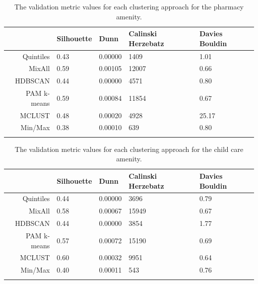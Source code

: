 \documentclass[11pt, a4paper]{article}
\begin{document}
\centering
\begin{longtable}[H]{|r|llll|}
  \hline
 & Silhouette & Dunn & Calinski Herzebatz & Davies Bouldin \\ 
  \hline
Quintiles & 0.43 & 0.00000 &  1409 &  1.01 \\ 
   \hline
MixAll & 0.59 & 0.00105 & 12007 &  0.66 \\ 
   \hline
HDBSCAN & 0.44 & 0.00000 &  4571 &  0.80 \\ 
   \hline
PAM k-means & 0.59 & 0.00084 & 11854 &  0.67 \\ 
   \hline
MCLUST & 0.48 & 0.00020 &  4928 & 25.17 \\ 
   \hline
Min/Max & 0.38 & 0.00010 &   639 &  0.80 \\ 
   \hline
\caption[Pharmacy validation metrics]{The validation metric values for each clustering approach for the pharmacy amenity.}\label{pharmacyvalid}
\end{longtable}









\centering
\begin{longtable}[H]{|r|llll|}
 \hline
 & Silhouette & Dunn & Calinski Herzebatz & Davies Bouldin \\ 
  \hline
Quintiles & 0.44 & 0.00000 &  3696 & 0.79 \\ 
   \hline
MixAll & 0.58 & 0.00067 & 15949 & 0.67 \\ 
   \hline
HDBSCAN & 0.44 & 0.00000 &  3854 & 1.77 \\ 
   \hline
PAM k-means & 0.57 & 0.00072 & 15190 & 0.69 \\ 
   \hline
MCLUST & 0.60 & 0.00032 &  9951 & 0.64 \\ 
   \hline
Min/Max & 0.40 & 0.00011 &   543 & 0.76 \\ 
   \hline
\caption[Child care validation metrics]{The validation metric values for each clustering approach for the child care amenity.}\label{childcarevalid}
\end{longtable}
\end{document}
